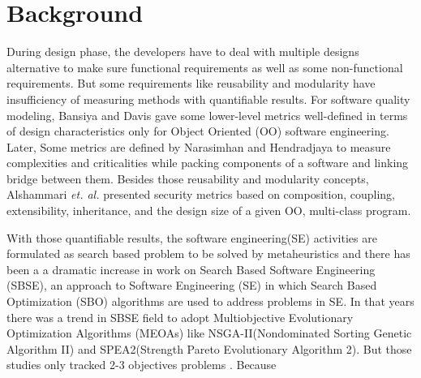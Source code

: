 \documentclass[letterpaper, 10 pt, conference]{ieeeconf}  %
\begin{document}
\section{Background}


During design phase, the developers have to deal with multiple designs alternative to make sure functional requirements as well as some non-functional requirements. But some requirements like reusability and modularity have insufficiency of measuring methods with quantifiable results. For software quality modeling, Bansiya and Davis gave some lower-level metrics well-defined in terms of design characteristics only for Object Oriented (OO) software engineering\cite{bansiya2002hierarchical}. Later, Some metrics are defined by Narasimhan and Hendradjaya to measure complexities and criticalities while packing components of a software and linking bridge between them\cite{narasimhan2007some}. Besides those reusability and modularity concepts, Alshammari \textit{et. al.} presented security metrics based on composition, coupling, extensibility, inheritance, and the design size of a given OO, multi-class program\cite{alshammari2010security}. 

With those quantifiable results, the software engineering(SE) activities are formulated as search based problem to be solved by metaheuristics and there has been a a dramatic increase in work on Search Based Software Engineering
(SBSE), an approach to Software Engineering (SE) in which Search Based Optimization (SBO) algorithms
are used to address problems in SE\cite{harman2012search}. In that years there was a trend in SBSE field to adopt Multiobjective Evolutionary Optimization Algorithms (MEOAs)\cite{zhou2011multiobjective} like NSGA-II(Nondominated Sorting Genetic Algorithm II)\cite{deb2002fast} and SPEA2(Strength Pareto Evolutionary Algorithm 2)\cite{zitzler2001spea2}. But those studies only tracked 2-3 objectives problems \cite{sayyad2013pareto}. Because 




\end{document}
